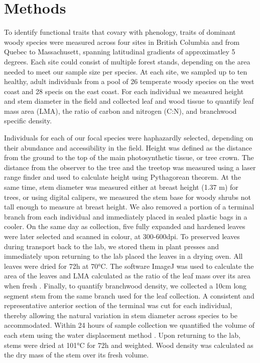 \documentclass{article}\usepackage[]{graphicx}\usepackage[]{color}
\begin{document}
\section*{Methods}
\par To identify functional traits that covary with phenology, traits of dominant woody species were measured across four sites in British Columbia and from Quebec to Massachusett, spanning latitudinal gradients of approximatley 5 degrees. Each site could consist of multiple forest stands, depending on the area needed to meet our sample size per species.  At each site, we sampled up to ten healthy, adult individuals from a pool of 26 temperate woody species on the west coast and 28 specis on the east coast. For each individual we measured height and stem diameter in the field and collected leaf and wood tissue to quantify leaf mass area (LMA), the ratio of carbon and nitrogen (C:N), and branchwood specific density. 

\par Individuals for each of our focal species were haphazardly selected, depending on their abundance and accessibility in the field. Height was defined as the distance from the ground to the top of the main photosynthetic tissue, or tree crown. The distance from the observer to the tree and the treetop was measured using a laser range finder and used to calculate height using Pythagorean theorem. At the same time, stem diameter was measured either at breast height (1.37 m) for trees, or using digital calipers, we measured the stem base for woody shrubs not tall enough to measure at breast height.  We also removed a portion of a terminal branch from each individual and immediately placed in sealed plastic bags in a cooler. On the same day as collection, five fully expanded and hardened leaves were later selected and scanned in colour, at 300-600dpi. To preserved leaves during transport back to the lab, we stored them in plant presses and immediately upon returning to the lab placed the leaves in a drying oven. All leaves were dried for 72h at 70°C. The software ImageJ was used to calculate the area of the leaves and LMA calculated as the ratio of the leaf mass over its area when fresh \cite{Perez-Harguindeguy2013}. Finally, to quantify branchwood density, we collected a 10cm long segment stem from the same branch used for the leaf collection. A consistent and representative anterior section of the terminal was cut for each individual, thereby allowing the natural variation in stem diameter across species to be accommodated. Within 24 hours of sample collection we quantified the volume of each stem using the water displacement method \cite{Perez-Harguindeguy2013}. Upon returning to the lab, stems were dried at 101°C for 72h and weighted. Wood density was calculated as the dry mass of the stem over its fresh volume.  
\end{document}
